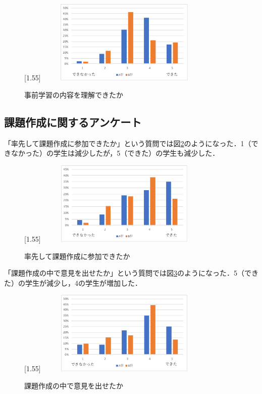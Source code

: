 \documentclass[a4j,11pt]{jsarticle}
\begin{document}
\begin{figure}[h]
\begin{center}
\scalebox{1.2}[1.55]{
 \includegraphics[clip,width=85mm,height=40mm]{anke4.pdf}
 }
\end{center}
 \caption{事前学習の内容を理解できたか}
 \label{anke4}
\end{figure}




\newpage

\subsection{課題作成に関するアンケート}
「率先して課題作成に参加できたか」という質問では図\ref{anke5}のようになった．1（できなかった）の学生は減少したが，5（できた）の学生も減少した．

\begin{figure}[h]
\begin{center}
\scalebox{1.2}[1.55]{
 \includegraphics[clip,width=85mm,height=40mm]{anke5.pdf}
 }
\end{center}
 \caption{率先して課題作成に参加できたか}
 \label{anke5}
\end{figure}



「課題作成の中で意見を出せたか」という質問では図\ref{anke6}のようになった．5（できた）の学生が減少し，4の学生が増加した．


\begin{figure}[h]
\begin{center}
\scalebox{1.2}[1.55]{
 \includegraphics[clip,width=85mm,height=40mm]{anke6.pdf}
 }
\end{center}
 \caption{課題作成の中で意見を出せたか}
 \label{anke6}
\end{figure}
\end{document}
